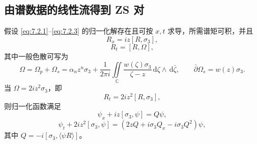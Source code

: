 \documentclass[lang=cn,scheme=chinese,mode=simple,device=normal,color=blue,math=cm,thmcnt=section,12pt]{elegantbook}
\newcommand{\dd}{\,\mathrm{d}}
\newcommand{\eqq}[2]{\tag{#1}\label{eq:#1}#2}
\begin{document}
\subsection{由谱数据的线性流得到 ZS 对}
\setcounter{proposition}{2}
\begin{proposition}
假设 \eqref{eq:7.2.1}--\eqref{eq:7.2.3} 的归一化解存在且可按 $x,t$ 求导，所需谱矩可积，并且
\begin{equation}
\eqq{7.2.6}{R_x=iz[R,\sigma_3],}
\end{equation}
\begin{equation}
\eqq{7.2.7}{R_t=[R,\Omega],}
\end{equation}
其中一般色散可写为
\begin{equation}
\eqq{7.2.8}{\Omega=\Omega_p+\Omega_s=\alpha_nz^n\sigma_3+
\dfrac{1}{2\pi i}\iint\limits_{\mathbb C}\dfrac{w(\zeta)\sigma_3}{\zeta-z}\dd\zeta\wedge\dd\bar\zeta,
\qquad \bar\partial\Omega_s=w(z)\sigma_3.}
\end{equation}
当 $\Omega=2iz^2\sigma_3$，即
\begin{equation}
\eqq{7.2.9}{R_t=2iz^2[R,\sigma_3],}
\end{equation}
则归一化函数满足
\begin{equation}
\eqq{7.2.10}{\psi_x+iz[\sigma_3,\psi]=Q\psi,}
\end{equation}
\begin{equation}
\eqq{7.2.11}{\psi_t+2iz^2[\sigma_3,\psi]=(2zQ+i\sigma_3Q_x-i\sigma_3Q^2)\psi,}
\end{equation}
其中 $Q=-i[\sigma_3,\langle\psi R\rangle]$。
\end{proposition}
\end{document}
